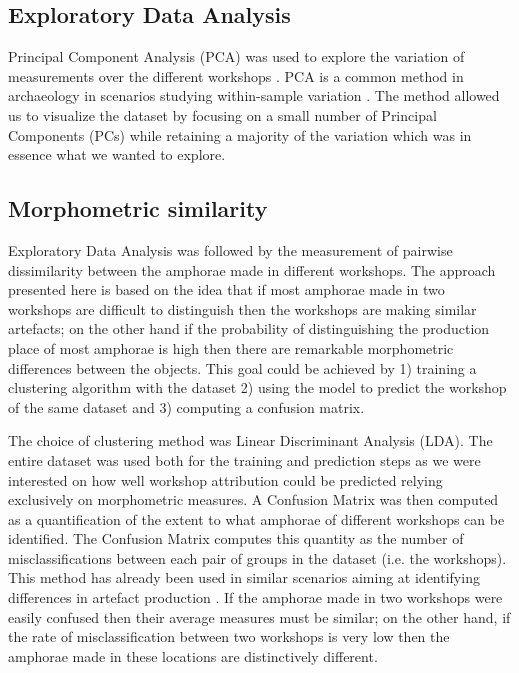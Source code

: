 \documentclass[review]{elsarticle}
\begin{document}
\subsection{Exploratory Data Analysis}

Principal Component Analysis (PCA) was used to explore the variation of measurements over the different workshops \citep{jolliffe_principal_2002} . PCA is a common method in archaeology in scenarios studying within-sample variation \citep{shennan_quantifying_1997, li_crossbows_2014, schillinger_differences_2016}. The method allowed us to visualize the dataset by focusing on a small number of Principal Components (PCs) while retaining a majority of the variation which was in essence what we wanted to explore. 

\subsection{Morphometric similarity} 

Exploratory Data Analysis was followed by the measurement of pairwise dissimilarity between the amphorae made in different workshops. The approach presented here is based on the idea that if most amphorae made in two workshops are difficult to distinguish then the workshops are making similar artefacts; on the other hand if the probability of distinguishing the production place of most amphorae is high then there are remarkable morphometric differences between the objects. This goal could be achieved by 1) training a clustering algorithm with the dataset 2) using the model to predict the workshop of the same dataset and 3) computing a confusion matrix.

The choice of clustering method was Linear Discriminant Analysis (LDA). The entire dataset was used both for the training and prediction steps as we were interested on how well workshop attribution could be predicted relying exclusively on morphometric measures. A Confusion Matrix was then computed as a quantification of the extent to what amphorae of different workshops can be identified. The Confusion Matrix computes this quantity as the number of misclassifications between each pair of groups in the dataset (i.e. the workshops). This method has already been used in similar scenarios aiming at identifying differences in artefact production \citep{thorpe_distribution_1984,i_martin_alisis_1998,charlton_investigating_2012}. If the amphorae made in two workshops were easily confused then their average measures must be similar; on the other hand, if the rate of misclassification between two workshops is very low then the amphorae made in these locations are distinctively different.
\end{document}
